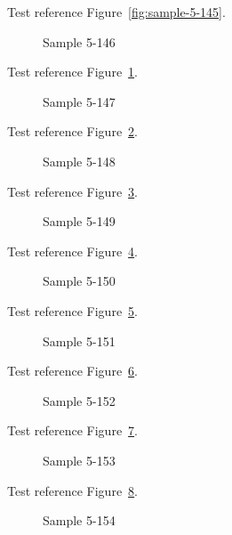 Test reference Figure~\ref{fig:sample-5-145}.

\begin{figure}[tbhp]
\caption{Sample 5-146}
\label{fig:sample-5-146}
\end{figure}

Test reference Figure~\ref{fig:sample-5-146}.

\begin{figure}[tbhp]
\caption{Sample 5-147}
\label{fig:sample-5-147}
\end{figure}

Test reference Figure~\ref{fig:sample-5-147}.

\begin{figure}[tbhp]
\caption{Sample 5-148}
\label{fig:sample-5-148}
\end{figure}

Test reference Figure~\ref{fig:sample-5-148}.

\begin{figure}[tbhp]
\caption{Sample 5-149}
\label{fig:sample-5-149}
\end{figure}

Test reference Figure~\ref{fig:sample-5-149}.

\begin{figure}[tbhp]
\caption{Sample 5-150}
\label{fig:sample-5-150}
\end{figure}

Test reference Figure~\ref{fig:sample-5-150}.

\begin{figure}[tbhp]
\caption{Sample 5-151}
\label{fig:sample-5-151}
\end{figure}

Test reference Figure~\ref{fig:sample-5-151}.

\begin{figure}[tbhp]
\caption{Sample 5-152}
\label{fig:sample-5-152}
\end{figure}

Test reference Figure~\ref{fig:sample-5-152}.

\begin{figure}[tbhp]
\caption{Sample 5-153}
\label{fig:sample-5-153}
\end{figure}

Test reference Figure~\ref{fig:sample-5-153}.

\begin{figure}[tbhp]
\caption{Sample 5-154}
\label{fig:sample-5-154}
\end{figure}

